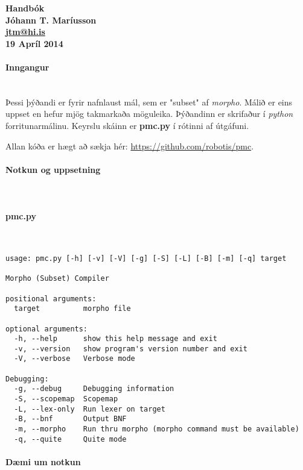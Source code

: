 \documentclass{article}
\begin{document}
\begin{center}
{\LARGE \textbf{Handbók}} ~\\
\textbf{Jóhann T. Maríusson} ~\\
\textbf{\href{mailto:jtm@hi.is}{jtm@hi.is}} ~\\
\textbf{19 Apríl 2014}
\end{center}

\clearpage
\paragraph{\Large Inngangur} ~\\

Þessi þýðandi er fyrir nafnlaust mál, sem er "subset" af \emph{morpho}. Málið er eins uppset en
hefur mjög takmarkaða möguleika. Þýðandinn er skrifaður í \emph{python} forritunarmálinu. Keyrslu skáinn er \textbf{pmc.py} 
í rótinni af útgáfuni.

Allan kóða er hægt að sækja hér: \url{https://github.com/robotis/pmc}.

\clearpage
\paragraph{{\Large Notkun og uppsetning}} ~\\

\paragraph{pmc.py} ~\\

\begin{verbatim}
usage: pmc.py [-h] [-v] [-V] [-g] [-S] [-L] [-B] [-m] [-q] target

Morpho (Subset) Compiler

positional arguments:
  target          morpho file

optional arguments:
  -h, --help      show this help message and exit
  -v, --version   show program's version number and exit
  -V, --verbose   Verbose mode

Debugging:
  -g, --debug     Debugging information
  -S, --scopemap  Scopemap
  -L, --lex-only  Run lexer on target
  -B, --bnf       Output BNF
  -m, --morpho    Run thru morpho (morpho command must be available)
  -q, --quite     Quite mode

\end{verbatim}

\clearpage
\paragraph{Dæmi um notkun} ~\\
\end{document}
